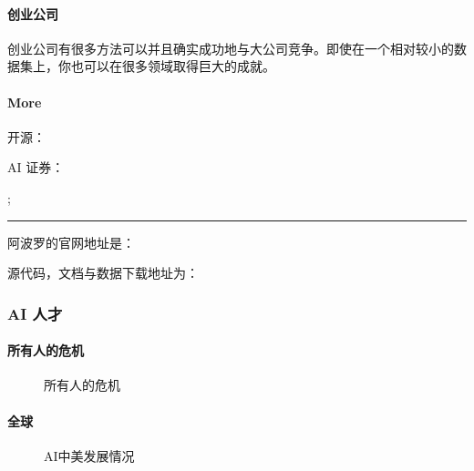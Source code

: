\documentclass[letterpaper,10pt,english]{sphinxmanual}
\begin{document}
\paragraph{创业公司}
\label{\detokenize{chapter_project/AI_company:id18}}
创业公司有很多方法可以并且确实成功地与大公司竞争。即使在一个相对较小的数据集上，你也可以在很多领域取得巨大的成就。


\paragraph{More}
\label{\detokenize{chapter_project/AI_company:more}}
 
开源： 

AI 证券：

;


\bigskip\hrule\bigskip


阿波罗的官网地址是： 

源代码，文档与数据下载地址为： 


\subsubsection{AI 人才}
\label{\detokenize{chapter_project/AI_talents:ai}}\label{\detokenize{chapter_project/AI_talents::doc}}

\paragraph{所有人的危机}
\label{\detokenize{chapter_project/AI_talents:id1}}
\begin{figure}[H]
\centering
\capstart

\noindent{}
\caption{所有人的危机\sphinxfootnotemark[741]}\label{\detokenize{chapter_project/AI_talents:id17}}\end{figure}
%
\begin{footnotetext}[741]\sphinxAtStartFootnote
{}
%
\end{footnotetext}\ignorespaces 

\paragraph{全球}
\label{\detokenize{chapter_project/AI_talents:id2}}
\begin{figure}[H]
\centering
\capstart

\noindent{}
\caption{AI中美发展情况}\label{\detokenize{chapter_project/AI_talents:id18}}\end{figure}
\end{document}
